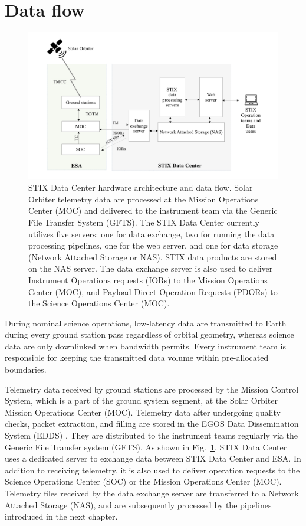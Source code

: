 \documentclass[referee]{aa} %
\begin{document}
\section{Data flow}
\begin{figure}
    \centering
    \includegraphics[width=0.9\linewidth]{figures/data_flow.pdf}
    \caption{ STIX Data Center hardware architecture and  data flow. Solar Orbiter telemetry data are processed at the Mission Operations Center (MOC) and delivered to the instrument team via the Generic File Transfer System (GFTS). 
    The STIX Data Center currently utilizes five servers: one for data exchange, two for running the data processing pipelines, one for the web server, and one for data storage (Network Attached Storage or NAS). STIX data products are stored on the NAS server. The data exchange server is also used to deliver Instrument Operations requests (IORs) to the Mission Operations Center (MOC), and Payload Direct Operation Requests (PDORs)  to  the Science Operations Center (MOC). 
    }
    \label{fig:data-flow}
\end{figure}
During nominal science operations, low-latency data are transmitted to Earth during every ground station pass regardless of orbital geometry, whereas science data are only downlinked when bandwidth permits. Every instrument team is responsible for keeping the transmitted data volume within pre-allocated boundaries. 


Telemetry data received by ground stations are processed by the Mission Control System, which is a part of the ground system segment, at the Solar Orbiter Mission Operations Center (MOC). Telemetry data after undergoing quality checks, packet extraction, and filling are stored in the  EGOS Data Dissemination System (EDDS) \citep{egos, EDDS}. They are distributed to the instrument teams regularly via the Generic File Transfer system (GFTS).  
As shown in Fig.~\ref{fig:data-flow},  STIX Data Center uses a dedicated  server to exchange data between STIX Data Center and ESA.  In addition to receiving telemetry, it is also used to deliver operation requests   to the Science Operations Center (SOC) or the Mission Operations Center (MOC).  
Telemetry files received by the data exchange server are transferred to a Network Attached Storage (NAS), and are subsequently processed by the pipelines introduced in the next chapter.
\end{document}
